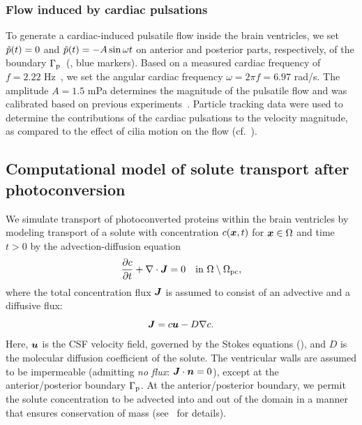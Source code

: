 \documentclass{WileyMSP-template}
\begin{document}



\subsubsection{Flow induced by cardiac pulsations}
To generate a cardiac-induced pulsatile flow inside the brain ventricles, we set $\Tilde{p}(t)=0$ and
$\Tilde{p}(t)=-A\sin{\omega t}$ on anterior and posterior parts, respectively, of the
boundary $\Gamma_{\mathrm{p}}$~(, blue markers).
Based on a measured cardiac frequency of $f=2.22$ Hz~\cite{Olstad2019CiliaryDevelopment},
we set the angular cardiac frequency $\omega=2\pi f=6.97$ rad/s. The amplitude $A=1.5$ mPa determines the magnitude of the pulsatile flow
and was calibrated based on previous experiments~\cite{Olstad2019CiliaryDevelopment}.
Particle tracking data were used to determine the contributions of the
cardiac pulsations to the velocity magnitude,
as compared to the effect of cilia motion on the flow (cf.~).

\subsection{Computational model of solute transport after photoconversion}
We simulate transport of photoconverted proteins within the brain ventricles by
modeling transport of a solute with concentration $c(\bm{x}, t)$ for $\bm{x}\in\Omega$ and
time $t > 0$ by the advection-diffusion equation
\begin{equation}
    \frac{\partial c}{\partial t} + \nabla\cdot\bm{J} = 0 \quad \text{in } \Omega\setminus\Omega_{\mathrm{pc}},
    \label{eq:adv_diff_strong}
\end{equation}
where the total concentration flux $\bm{J}$ is assumed to consist of an advective and a diffusive flux:
\begin{equation*}
    \bm{J} = c\bm{u} - D\nabla c .
\end{equation*}
Here, $\bm{u}$ is the CSF velocity field, governed by the Stokes equations (),
and $D$ is the molecular diffusion coefficient of the solute. 
The ventricular walls are assumed to be impermeable (admitting \emph{no flux}: $\bm{J}\cdot\bm{n}=0$),
except at the anterior/posterior boundary $\Gamma_{\mathrm{p}}$.
At the anterior/posterior boundary, we permit the solute concentration to be advected into
and out of the domain in a manner that ensures conservation of mass
(see~ for details).
\end{document}
